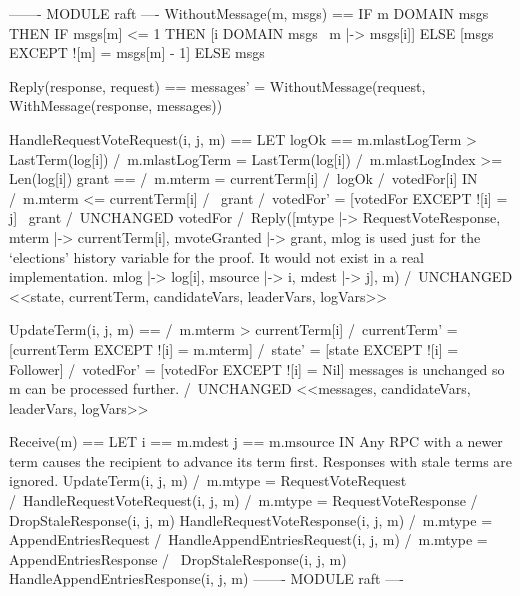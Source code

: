 \documentclass{report}
\begin{document}
\begin{tla}
------- MODULE raft ---- 
WithoutMessage(m, msgs) ==
    IF m \in DOMAIN msgs THEN
        IF msgs[m] <= 1 THEN [i \in DOMAIN msgs \ {m} |-> msgs[i]]
        ELSE [msgs EXCEPT ![m] = msgs[m] - 1]
    ELSE
        msgs

Reply(response, request) ==
    messages' = WithoutMessage(request, WithMessage(response, messages))

HandleRequestVoteRequest(i, j, m) ==
    LET logOk == \/ m.mlastLogTerm > LastTerm(log[i])
                 \/ /\ m.mlastLogTerm = LastTerm(log[i])
                    /\ m.mlastLogIndex >= Len(log[i])
        grant == /\ m.mterm = currentTerm[i]
                 /\ logOk
                 /\ votedFor[i] 
    IN /\ m.mterm <= currentTerm[i]
       /\ \/ grant  /\ votedFor' = [votedFor EXCEPT ![i] = j]
          \/ ~grant /\ UNCHANGED votedFor
       /\ Reply([mtype        |-> RequestVoteResponse,
                 mterm        |-> currentTerm[i],
                 mvoteGranted |-> grant,
                 \* mlog is used just for the `elections' history variable for
                 \* the proof. It would not exist in a real implementation.
                 mlog         |-> log[i],
                 msource      |-> i,
                 mdest        |-> j],
                 m)
       /\ UNCHANGED <<state, currentTerm, candidateVars, leaderVars, logVars>>

UpdateTerm(i, j, m) ==
    /\ m.mterm > currentTerm[i]
    /\ currentTerm'    = [currentTerm EXCEPT ![i] = m.mterm]
    /\ state'          = [state       EXCEPT ![i] = Follower]
    /\ votedFor'       = [votedFor    EXCEPT ![i] = Nil]
       \* messages is unchanged so m can be processed further.
    /\ UNCHANGED <<messages, candidateVars, leaderVars, logVars>>

Receive(m) ==
    LET i == m.mdest
        j == m.msource
    IN \* Any RPC with a newer term causes the recipient to advance
       \* its term first. Responses with stale terms are ignored.
       \/ UpdateTerm(i, j, m)
       \/ /\ m.mtype = RequestVoteRequest
          /\ HandleRequestVoteRequest(i, j, m)
       \/ /\ m.mtype = RequestVoteResponse
          /\ \/ DropStaleResponse(i, j, m)
             \/ HandleRequestVoteResponse(i, j, m)
       \/ /\ m.mtype = AppendEntriesRequest
          /\ HandleAppendEntriesRequest(i, j, m)
       \/ /\ m.mtype = AppendEntriesResponse
          /\ \/ DropStaleResponse(i, j, m)
             \/ HandleAppendEntriesResponse(i, j, m)
------- MODULE raft ---- 
\end{tla}
\end{document}
